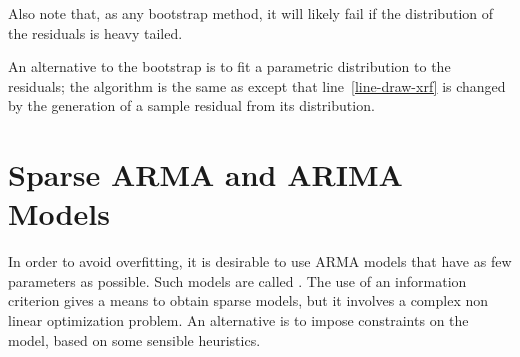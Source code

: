 Also note that, as any bootstrap method, it will
likely fail if the distribution of the residuals is
heavy tailed.

An alternative to the bootstrap is to fit a parametric
distribution to the residuals; the algorithm is the same as
 except that line~\ref{line-draw-xrf} is
changed by the generation of a sample residual from its
distribution.
%
\begin{figure}[htbp]\begin{center}
{}
\end{center} \label{fig-sprint-arima-constrained-bs}
\end{figure}

\section{Sparse ARMA and ARIMA Models} In order to
avoid overfitting, it is desirable to use ARMA models
that have as few parameters as possible. Such models
are called . The use of an information
criterion gives a means to obtain sparse models, but
it involves a complex non linear optimization problem.
An alternative is to impose constraints on the model,
based on some sensible heuristics.

